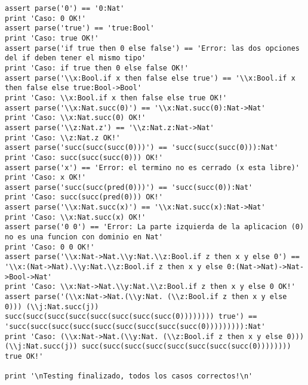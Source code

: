 \begin{verbatim}
assert parse('0') == '0:Nat'
print 'Caso: 0 OK!'
assert parse('true') == 'true:Bool'
print 'Caso: true OK!'
assert parse('if true then 0 else false') == 'Error: las dos opciones del if deben tener el mismo tipo'
print 'Caso: if true then 0 else false OK!'
assert parse('\\x:Bool.if x then false else true') == '\\x:Bool.if x then false else true:Bool->Bool'
print 'Caso: \\x:Bool.if x then false else true OK!'
assert parse('\\x:Nat.succ(0)') == '\\x:Nat.succ(0):Nat->Nat'
print 'Caso: \\x:Nat.succ(0) OK!'
assert parse('\\z:Nat.z') == '\\z:Nat.z:Nat->Nat'
print 'Caso: \\z:Nat.z OK!'
assert parse('succ(succ(succ(0)))') == 'succ(succ(succ(0))):Nat'
print 'Caso: succ(succ(succ(0))) OK!'
assert parse('x') == 'Error: el termino no es cerrado (x esta libre)'
print 'Caso: x OK!'
assert parse('succ(succ(pred(0)))') == 'succ(succ(0)):Nat'
print 'Caso: succ(succ(pred(0))) OK!'
assert parse('\\x:Nat.succ(x)') == '\\x:Nat.succ(x):Nat->Nat'
print 'Caso: \\x:Nat.succ(x) OK!'
assert parse('0 0') == 'Error: La parte izquierda de la aplicacion (0) no es una funcion con dominio en Nat'
print 'Caso: 0 0 OK!'
assert parse('\\x:Nat->Nat.\\y:Nat.\\z:Bool.if z then x y else 0') == '\\x:(Nat->Nat).\\y:Nat.\\z:Bool.if z then x y else 0:(Nat->Nat)->Nat->Bool->Nat'
print 'Caso: \\x:Nat->Nat.\\y:Nat.\\z:Bool.if z then x y else 0 OK!'
assert parse('(\\x:Nat->Nat.(\\y:Nat. (\\z:Bool.if z then x y else 0))) (\\j:Nat.succ(j)) succ(succ(succ(succ(succ(succ(succ(succ(0)))))))) true') == 'succ(succ(succ(succ(succ(succ(succ(succ(succ(0))))))))):Nat'
print 'Caso: (\\x:Nat->Nat.(\\y:Nat. (\\z:Bool.if z then x y else 0))) (\\j:Nat.succ(j)) succ(succ(succ(succ(succ(succ(succ(succ(0)))))))) true OK!'

print '\nTesting finalizado, todos los casos correctos!\n'

\end{verbatim}